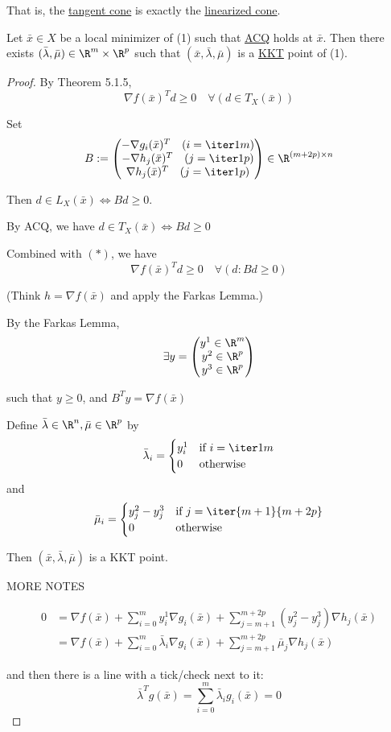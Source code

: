 That is, the \href{add7a4b}{tangent cone} is exactly the
\href{ca4f471}{linearized cone}.

\label{b1c5437}

Let $\bar x\in X$ be a local minimizer of (1) such that
\href{adc266e}{ACQ} holds at $\bar x$. Then there exists
$(\bar\lambda,\bar\mu)\in\R^m\times\R^p$ such that $(\bar
	x,\bar\lambda,\bar\mu)$ is a \href{b38093d}{KKT} point of (1).

\begin{proof}
	\def\bm{\bar\mu}\def\bl{\bar\lambda}\def\bx{\bar x}
	By Theorem 5.1.5,
	\begin{equation*}
		\nabla f(\bx)^Td\geq0\quad\forall(d\in T_X(\bx))\tag*{($*$)}
	\end{equation*}

	Set
	$$
		B:=\begin{pmatrix}
			-\nabla g_i(\bx)^T\quad(i=\iter1m) \\
			-\nabla h_j(\bx)^T\quad(j=\iter1p) \\
			\nabla h_j(\bx)^T\quad(j=\iter1p)
		\end{pmatrix}\in\R^{(m+2p)\times{n}}
	$$

	Then $d\in L_X(\bx)\iff Bd\geq0$.

	By ACQ, we have $d\in T_X(\bx)\iff Bd\geq0$

	Combined with $(*)$, we have
	$$
		\nabla f(\bx)^Td\geq0\quad\forall(d:Bd\geq0)
	$$

	(Think $h=\nabla f(\bx)$ and apply the Farkas Lemma.)

	By the Farkas Lemma,
	$$
		\exists y=\begin{pmatrix}y^1\in\R^m\\y^2\in\R^p\\y^3\in\R^p\end{pmatrix}
	$$

	such that $y\geq0$, and $B^Ty=\nabla f(\bx)$

	Define $\bl\in\R^n,\bm\in\R^p$ by
	$$
		\bl_i=\begin{cases}
			y^1_i & \text{if $i=\iter1m$} \\
			0     & \text{otherwise}
		\end{cases}
	$$
	and
	$$
		\bm_i=\begin{cases}
			y^2_j - y^3_j & \text{if $j=\iter{m+1}{m+2p}$} \\
			0             & \text{otherwise}
		\end{cases}
	$$

	Then $(\bx,\bl,\bm)$ is a KKT point.

	MORE NOTES

	\begin{align*}
		0
		 & = \nabla f(\bx)
		+\sum_{i=0}^my^1_i\nabla g_i(\bx)
		+\sum_{j=m+1}^{m+2p}(y^2_j-y^3_j)\nabla h_j(\bx) \\
		 & = \nabla f(\bx)
		+\sum_{i=0}^m \bl_i\nabla g_i(\bx)
		+\sum_{j=m+1}^{m+2p}\bm_j\nabla h_j(\bx)
	\end{align*}

	and then there is a line with a tick/check next to it:
	$$
		\bl^Tg(\bx)=\sum_{i=0}^m\bl_ig_i(\bx)=0
	$$
\end{proof}

